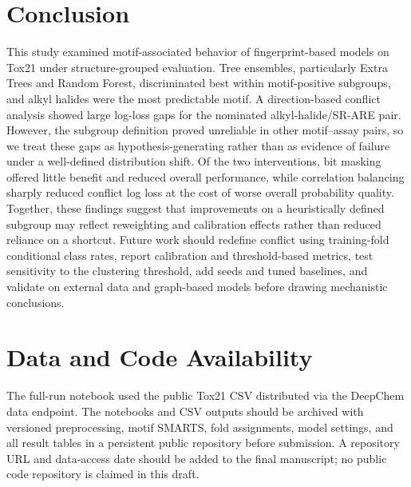 \documentclass[conference]{IEEEtran}
\begin{document}
\section{Conclusion}
This study examined motif-associated behavior of fingerprint-based models on Tox21 under structure-grouped evaluation. Tree ensembles, particularly Extra Trees and Random Forest, discriminated best within motif-positive subgroups, and alkyl halides were the most predictable motif. A direction-based conflict analysis showed large log-loss gaps for the nominated alkyl-halide/SR-ARE pair. However, the subgroup definition proved unreliable in other motif--assay pairs, so we treat these gaps as hypothesis-generating rather than as evidence of failure under a well-defined distribution shift. Of the two interventions, bit masking offered little benefit and reduced overall performance, while correlation balancing sharply reduced conflict log loss at the cost of worse overall probability quality. Together, these findings suggest that improvements on a heuristically defined subgroup may reflect reweighting and calibration effects rather than reduced reliance on a shortcut. Future work should redefine conflict using training-fold conditional class rates, report calibration and threshold-based metrics, test sensitivity to the clustering threshold, add seeds and tuned baselines, and validate on external data and graph-based models before drawing mechanistic conclusions.

\section*{Data and Code Availability}
The full-run notebook used the public Tox21 CSV distributed via the DeepChem data endpoint. The notebooks and CSV outputs should be archived with versioned preprocessing, motif SMARTS, fold assignments, model settings, and all result tables in a persistent public repository before submission. A repository URL and data-access date should be added to the final manuscript; no public code repository is claimed in this draft.
\end{document}
